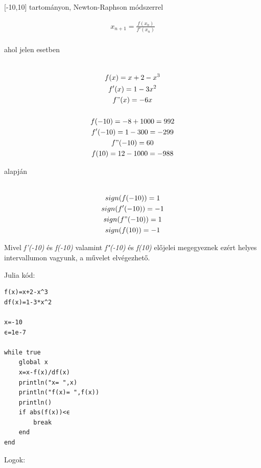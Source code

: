 \documentclass{article}
\begin{document}
[-10,10] tartományon, Newton-Raphson módszerrel

\begin{multline}
x_{n+1} = \frac{f(x_n)}{f'(x_n)} \\
\end{multline}

ahol jelen esetben

\begin{multline}
\\
f(x) = x+2 - x^{3}\\
f'(x) = 1-3x^{2}\\
f"(x) = -6x\\
\\
f(-10) = -8+1000= 992\\
f'(-10) = 1 - 300 = -299\\
f"(-10) = 60\\
f(10) = 12-1000 = -988\\
\end{multline}

alapján 

\begin{multline}
\\
sign(f(-10)) = 1\\
sign(f'(-10)) = -1\\
sign(f"(-10)) = 1\\
sign(f(10)) = -1\\
\end{multline}

Mivel \textit{f'(-10)} és \textit{f(-10)} valamint \textit{f"(-10)} és \textit{f(10)} előjelei megegyeznek ezért helyes intervallumon vagyunk, a művelet elvégezhető.


Julia kód:

\begin{verbatim}
f(x)=x+2-x^3
df(x)=1-3*x^2

x=-10
ϵ=1e-7

while true
    global x
    x=x-f(x)/df(x)
    println("x= ",x)
    println("f(x)= ",f(x))
    println()
    if abs(f(x))<ϵ
        break
    end
end
\end{verbatim}

Logok:
\end{document}
